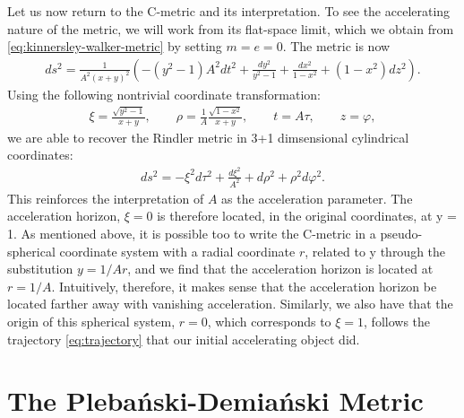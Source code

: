 \documentclass[
twoside,
openright,
frontopenright,
]{dmathesis}
\begin{document}
Let us now return to the C-metric and its interpretation. To see the
accelerating nature of the metric, we will work from its flat-space limit, which
we obtain from \cref{eq:kinnersley-walker-metric} by setting $m=e=0$. The metric
is now
\begin{align}
  \label{eq:flatlimit}
  ds^2=\frac{1}{A^2(x+y)^2}\left(-(y^2-1)A^2dt^2+\frac{dy^2}{y^2-1} +
  \frac{dx^2}{1-x^2} + (1-x^2)dz^2\right).
\end{align}
Using the following nontrivial coordinate transformation:
\begin{align}
  \xi = \frac{\sqrt{y^2-1}}{x + y}, \qquad \rho =
  \frac{1}{A}\frac{\sqrt{1-x^2}}{x+y}, \qquad t=A\tau, \qquad z=\varphi,
\end{align}
we are able to recover the Rindler metric in 3+1 dimsensional cylindrical
coordinates:
\begin{align}
  \label{eq:rindler}
  ds^2 = -\xi^2 d\tau^2 + \frac{d\xi^2}{A^2} + d\rho^2 + \rho^2 d\varphi^2.
\end{align}
This reinforces the interpretation of $A$ as the acceleration parameter. The
acceleration horizon, $\xi = 0$ is therefore located, in the original
coordinates, at y = 1. As mentioned above, it is possible too to write the
C-metric in a pseudo-spherical coordinate system with a radial coordinate $r$,
related to y through the substitution $y = 1/Ar$, and we find that the
acceleration horizon is located at $r = 1/A$. Intuitively, therefore, it makes
sense that the acceleration horizon be located farther away with vanishing
acceleration. Similarly, we also have that the origin of this spherical system,
$r = 0$, which corresponds to $\xi = 1$, follows the trajectory
\eqref{eq:trajectory} that our initial accelerating object did.


\section{The Pleba\'nski-Demia\'nski Metric}
\label{sec:PD}
\end{document}
